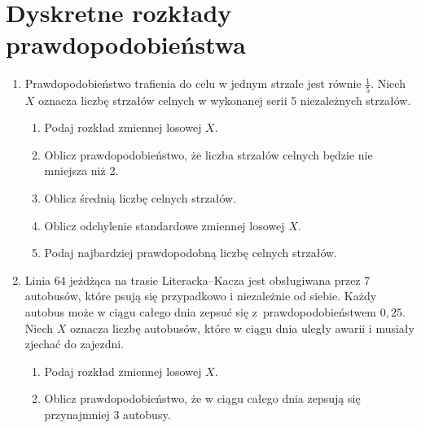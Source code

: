 \documentclass[twoside]{mwart}
\newcommand{\ans}[1]{}
\newenvironment{ansenv}{\comment}{\endcomment}
\newenvironment{ansenv}{\paragraph{Odpowiedź:}}{}
\newcommand{\ans}[1]{\begin{ansenv}#1\end{ansenv}}
\begin{document}
\section{Dyskretne rozkłady prawdopodobieństwa}
\begin{enumerate}
\item Prawdopodobieństwo trafienia do celu w jednym strzale jest równie $\frac{1}{5}$. Niech $X$ oznacza liczbę strzałów celnych w wykonanej serii 5 niezależnych strzałów. 
\begin{enumerate}
\item Podaj rozkład zmiennej losowej $X$. \ans{
	Mamy do czynienia z powtarzającymi się próbami, niezależnymi od siebie, o stałym prawdopodobieństwie sukcesu i których liczba jest z góry ustalona. Zatem korzystamy z rozkładu dwumianowego:
	\[P(X=k)={5 \choose k}\left(\frac{1}{5}\right)^k\left(\frac{4}{5}\right)^{5-k} \qquad k\in\{0,1,\ldots,5\}\]
}
\item Oblicz prawdopodobieństwo, że liczba strzałów celnych będzie nie mniejsza niż 2. \ans{$P(X\geq 2)=1-P(X=0)-P(X=1)=1-\frac{4^5}{5^5}-5\cdot\frac{4^4}{5^5}=\frac{821}{3125}\approx0{,}263$}
\item Oblicz średnią liczbę celnych strzałów. \ans{$EX=np=1$}
\item Oblicz odchylenie standardowe zmiennej losowej $X$. \ans{$DX=\sqrt{np(1-p)}=\sqrt{\frac{4}{5}}$}
\item Podaj najbardziej prawdopodobną liczbę celnych strzałów. \ans{
	Patrzymy czy iloczyn $(n+1)p$ jest liczbą całkowitą. W tym przypadku nie jest ($(n+1)p=\frac{6}{5}$), a zatem jest jeden punkt najbardziej prawdopodobny:
	$\lfloor(n+1)p\rfloor=1$}
\end{enumerate}
\item Linia 64 jeżdżąca na trasie Literacka--Kacza jest obsługiwana przez 7 autobusów, które psują się przypadkowo i niezależnie od siebie. Każdy autobus może w ciągu całego dnia zepsuć się z~prawdopodobieństwem $0{,}25$. Niech $X$ oznacza liczbę autobusów, które w ciągu dnia uległy awarii i musiały zjechać do zajezdni.
\begin{enumerate}
\item Podaj rozkład zmiennej losowej $X$.
\ans{
	Mamy do czynienia z sytuacją analogiczną jak w poprzednim zadaniu, a zatem
	\[ P(X=k)={7\choose k}\left(0{,}25\right)^k\left(0{,}75\right)^{7-k} \qquad k\in\{0,1,\ldots,7\} \]
}
\item Oblicz prawdopodobieństwo, że w ciągu całego dnia zepsują się przynajmniej 3 autobusy.
\ans{
	\begin{align*}

\end{align*}}
\end{enumerate}
\end{enumerate}
\end{document}

